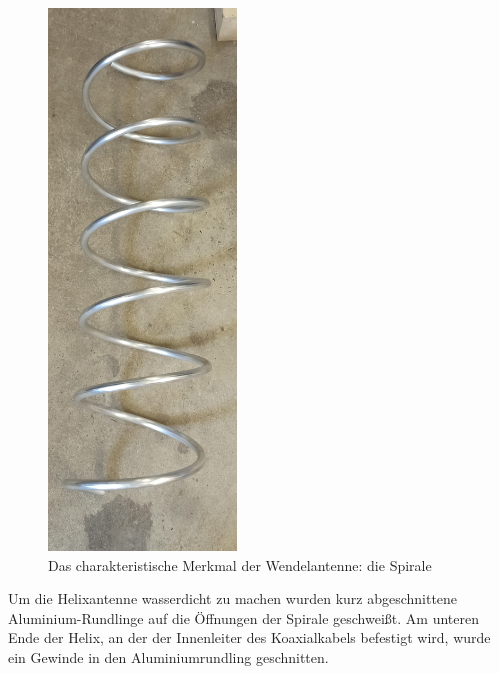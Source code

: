 \begin{figure}[H]
	\centering
	\includegraphics[width=5cm,angle=90]{../ref/Spirale.jpg}
	\caption{Das charakteristische Merkmal der Wendelantenne: die Spirale}
	\label{fig:Spirale}
\end{figure}

Um die Helixantenne wasserdicht zu machen wurden kurz abgeschnittene Aluminium-Rundlinge auf die Öffnungen der Spirale geschweißt. Am unteren Ende der Helix, an der der Innenleiter des Koaxialkabels befestigt wird, wurde ein Gewinde in den Aluminiumrundling geschnitten.

